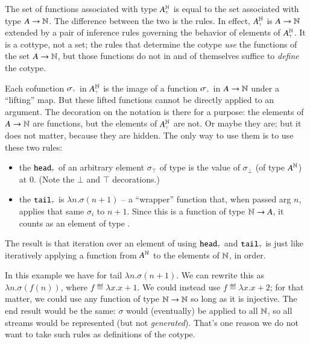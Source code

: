 The set of functions associated with type \(A_{\scriptscriptstyle\top}^{\mathbb{N}}\) is
equal to the set associated with type \(A\rightarrow{}\mathbb{N}\). The
difference between the two is the rules. In effect,
\(A_{\scriptscriptstyle\top}^{\mathbb{N}}\) is \(A\rightarrow{}\mathbb{N}\) extended by a pair of
inference rules governing the behavior of elements of
\(A_{\scriptscriptstyle\top}^{\mathbb{N}}\). It is a cottype, not a set; the rules that
determine the cotype \textit{use} the functions of the set
\(A\rightarrow{}\mathbb{N}\), but those functions do not in and of themselves
suffice to \textit{define} the cotype.

Each cofunction \(\sigma_{\scriptscriptstyle{\top}}\) in \(A_{\scriptscriptstyle\top}^{\mathbb{N}}\) is the image
of a function \(\sigma_{\scriptscriptstyle{\bot}}\) in \(A\rightarrow{}\mathbb{N}\) under a ``lifting''
map. But these lifted functions cannot be directly applied to an
argument. The decoration on the notation is there for a purpose: the
elements of \(A\rightarrow{}\mathbb{N}\) are functions, but the elements of
\(A_{\scriptscriptstyle\top}^{\mathbb{N}}\) are not. Or maybe they are; but it does not
matter, because they are hidden. The only way to use them is to use
these two rules:

\begin{itemize}
\item the \(\texttt{\upshape head}_{\scriptscriptstyle\top}\) of an arbitrary element
  \(\sigma_{\scriptscriptstyle{\top}}\) of type  is
  the value of \(\sigma_{\scriptscriptstyle\bot}\) (of type \(A^{\mathbb{N}}\)) at \(0\). (Note the \(\bot\) and \(\top\) decorations.)
\item the \(\texttt{\upshape tail}_{\scriptscriptstyle\top}\) is \(\lambda{}n.\sigma(n+1)\) -- a ``wrapper''
  function that, when passed arg \(n\), applies that same \(\sigma_i\)
  to \(n+1\). Since this is a function of type \(\mathbb{N}\rightarrow{}A\), it
  counts as an element of type .
\end{itemize}

The result is that iteration over an element of 
using \(\texttt{\upshape head}_{\scriptscriptstyle\top}\) and \(\texttt{\upshape tail}_{\scriptscriptstyle\top}\) is just like iteratively applying a function from \(A^{\mathbb{N}}\) to the elements of \(\mathbb{N}\), in order.

In this example we have for tail \(\lambda{}n.\sigma(n+1)\). We can
rewrite this as \(\lambda{}n.\sigma(f(n))\), where
\(f\eqdef\lambda{}x.x+1\). We could instead use
\(f\eqdef\lambda{}x.x+2\); for that matter, we could use any function
of type \(\mathbb{N}\rightarrow{}\mathbb{N}\) so long as it is injective. The end
result would be the same: \(\sigma\) would (eventually) be applied to
all \(\mathbb{N}\), so all streams would be represented (but not
\textit{generated}). That's one reason we do not want to take such
rules as definitions of the cotype.

